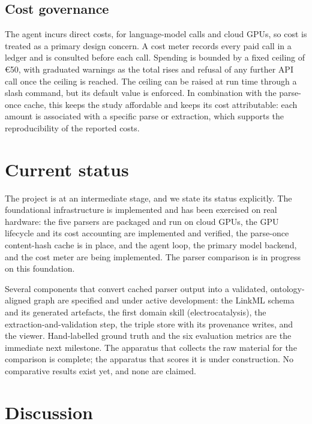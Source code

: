 \documentclass{template}
\begin{document}
\subsection{Cost governance}

The agent incurs direct costs, for language-model calls and cloud GPUs, so cost is treated as a primary design concern. A cost meter records every paid call in a ledger and is consulted before each call. Spending is bounded by a fixed ceiling of \euro{}50, with graduated warnings as the total rises and refusal of any further API call once the ceiling is reached. The ceiling can be raised at run time through a slash command, but its default value is enforced. In combination with the parse-once cache, this keeps the study affordable and keeps its cost attributable: each amount is associated with a specific parse or extraction, which supports the reproducibility of the reported costs.


\section{Current status}

The project is at an intermediate stage, and we state its status explicitly. The foundational infrastructure is implemented and has been exercised on real hardware: the five parsers are packaged and run on cloud GPUs, the GPU lifecycle and its cost accounting are implemented and verified, the parse-once content-hash cache is in place, and the agent loop, the primary model backend, and the cost meter are being implemented. The parser comparison is in progress on this foundation.

Several components that convert cached parser output into a validated, ontology-aligned graph are specified and under active development: the LinkML schema and its generated artefacts, the first domain skill (electrocatalysis), the extraction-and-validation step, the triple store with its provenance writes, and the viewer. Hand-labelled ground truth and the six evaluation metrics are the immediate next milestone. The apparatus that collects the raw material for the comparison is complete; the apparatus that scores it is under construction. No comparative results exist yet, and none are claimed.


\section{Discussion}
\end{document}
